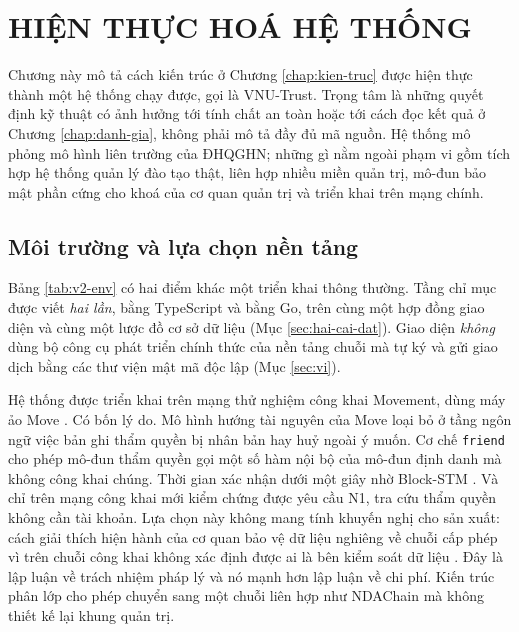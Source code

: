 \chapter{HIỆN THỰC HOÁ HỆ THỐNG}
\label{chap:hien-thuc}

Chương này mô tả cách kiến trúc ở Chương \ref{chap:kien-truc} được hiện thực thành một hệ thống chạy được, gọi là VNU-Trust. Trọng tâm là những quyết định kỹ thuật có ảnh hưởng tới tính chất an toàn hoặc tới cách đọc kết quả ở Chương \ref{chap:danh-gia}, không phải mô tả đầy đủ mã nguồn. Hệ thống mô phỏng mô hình liên trường của ĐHQGHN; những gì nằm ngoài phạm vi gồm tích hợp hệ thống quản lý đào tạo thật, liên hợp nhiều miền quản trị, mô-đun bảo mật phần cứng cho khoá của cơ quan quản trị và triển khai trên mạng chính.

\section{Môi trường và lựa chọn nền tảng}
\label{sec:moi-truong}



Bảng \ref{tab:v2-env} có hai điểm khác một triển khai thông thường. Tầng chỉ mục được viết \emph{hai lần}, bằng TypeScript và bằng Go, trên cùng một hợp đồng giao diện và cùng một lược đồ cơ sở dữ liệu (Mục \ref{sec:hai-cai-dat}). Giao diện \emph{không} dùng bộ công cụ phát triển chính thức của nền tảng chuỗi mà tự ký và gửi giao dịch bằng các thư viện mật mã độc lập (Mục \ref{sec:vi}).

Hệ thống được triển khai trên mạng thử nghiệm công khai Movement, dùng máy ảo Move \cite{Movement2024}. Có bốn lý do. Mô hình hướng tài nguyên của Move \cite{Blackshear2019Move} loại bỏ ở tầng ngôn ngữ việc bản ghi thẩm quyền bị nhân bản hay huỷ ngoài ý muốn. Cơ chế \texttt{friend} cho phép mô-đun thẩm quyền gọi một số hàm nội bộ của mô-đun định danh mà không công khai chúng. Thời gian xác nhận dưới một giây nhờ Block-STM \cite{Gelashvili2023}. Và chỉ trên mạng công khai mới kiểm chứng được yêu cầu N1, tra cứu thẩm quyền không cần tài khoản. Lựa chọn này không mang tính khuyến nghị cho sản xuất: cách giải thích hiện hành của cơ quan bảo vệ dữ liệu nghiêng về chuỗi cấp phép vì trên chuỗi công khai không xác định được ai là bên kiểm soát dữ liệu \cite{EDPB2025}. Đây là lập luận về trách nhiệm pháp lý và nó mạnh hơn lập luận về chi phí. Kiến trúc phân lớp cho phép chuyển sang một chuỗi liên hợp như NDAChain \cite{NDAChain2025} mà không thiết kế lại khung quản trị.

